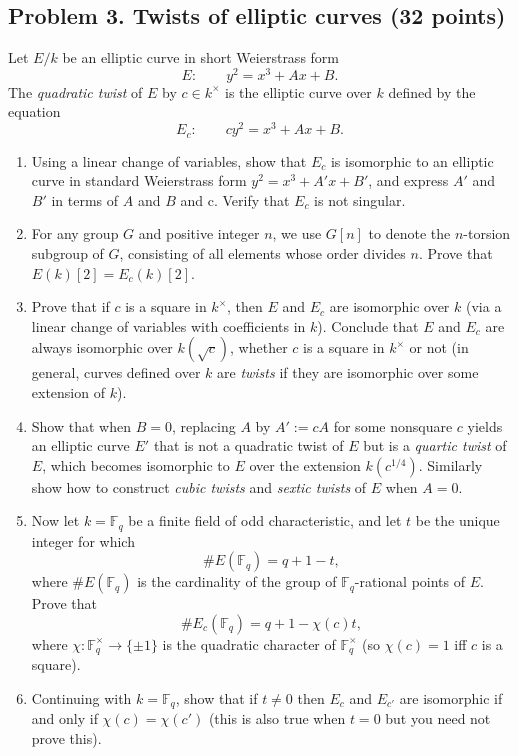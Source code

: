 \documentclass[11pt]{article}
\newcommand{\Fq}{\mathbb{F}_q}
\begin{document}
\subsection*{Problem 3. Twists of elliptic curves (32 points)}
Let $E/k$ be an elliptic curve in short Weierstrass form
\[
E\colon\qquad y^2 = x^3 + Ax +B.
\]
The \emph{quadratic twist} of $E$ by $c\in k^\times$ is the elliptic curve over $k$ defined by the equation
\[
E_c\colon\qquad cy^2 = x^3 + Ax + B.
\]
\begin{enumerate}
\item[\textbf{(a)}] Using a linear change of variables, show that $E_c$ is isomorphic to an elliptic curve in standard Weierstrass form $y^2=x^3+A'x + B'$, and express $A'$ and $B'$ in terms of $A$ and $B$ and c.  Verify that $E_c$ is not singular.
\item[\textbf{(b)}] For any group $G$ and positive integer $n$, we use $G[n]$ to denote the $n$-torsion subgroup of $G$, consisting of all elements whose order divides $n$.  Prove that $E(k)[2] = E_c(k)[2]$.
\item[\textbf{(c)}] Prove that if $c$ is a square in $k^\times$, then $E$ and $E_c$ are isomorphic over $k$ (via a linear change of variables with coefficients in $k$).
Conclude that $E$ and $E_c$ are always isomorphic over $k(\sqrt{c})$, whether $c$ is a square in $k^\times$ or not (in general, curves defined over $k$ are \emph{twists} if they are isomorphic over some extension of $k$).
\item[\textbf{(d)}] Show that when $B=0$, replacing $A$ by $A':=cA$ for some nonsquare $c$ yields an elliptic curve $E'$ that is not a quadratic twist of $E$ but is a \emph{quartic twist} of $E$, which becomes isomorphic to $E$ over the extension $k(c^{1/4})$.  Similarly show how to construct \emph{cubic twists} and \emph{sextic twists} of $E$ when $A=0$.
\item[\textbf{(e)}] Now let $k=\Fq$ be a finite field of odd characteristic, and let $t$ be the unique integer for which
\[
\#E(\Fq) =q+1-t,
\]
where $\#E(\Fq)$ is the cardinality of the group of $\Fq$-rational points of $E$.
Prove that
\[
\#E_c(\Fq) = q+1 - \chi(c)t,
\]
where $\chi\colon\Fq^\times\to \{\pm 1\}$ is the quadratic character of $\Fq^\times$ (so $\chi(c)=1$ iff $c$ is a square).
\item[\textbf{(f)}] Continuing with $k=\Fq$, show that if $t\ne 0$ then $E_c$ and $E_{c'}$ are isomorphic if and only if $\chi(c)=\chi(c')$ (this is also true when $t=0$ but you need not prove this).
\end{enumerate}
\end{document}
